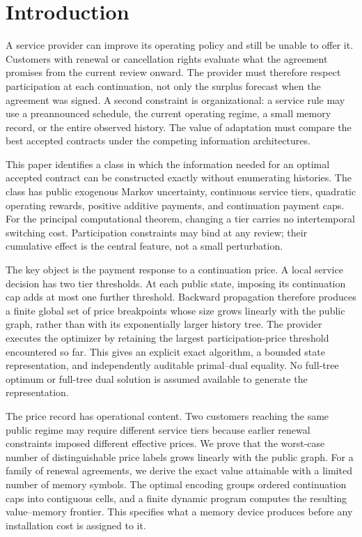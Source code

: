 \section{Introduction}
A service provider can improve its operating policy and still be unable to offer it. Customers with renewal or cancellation rights evaluate what the agreement promises from the current review onward. The provider must therefore respect participation at each continuation, not only the surplus forecast when the agreement was signed. A second constraint is organizational: a service rule may use a preannounced schedule, the current operating regime, a small memory record, or the entire observed history. The value of adaptation must compare the best accepted contracts under the competing information architectures.

This paper identifies a class in which the information needed for an optimal accepted contract can be constructed exactly without enumerating histories. The class has public exogenous Markov uncertainty, continuous service tiers, quadratic operating rewards, positive additive payments, and continuation payment caps. For the principal computational theorem, changing a tier carries no intertemporal switching cost. Participation constraints may bind at any review; their cumulative effect is the central feature, not a small perturbation.

The key object is the payment response to a continuation price. A local service decision has two tier thresholds. At each public state, imposing its continuation cap adds at most one further threshold. Backward propagation therefore produces a finite global set of price breakpoints whose size grows linearly with the public graph, rather than with its exponentially larger history tree. The provider executes the optimizer by retaining the largest participation-price threshold encountered so far. This gives an explicit exact algorithm, a bounded state representation, and independently auditable primal--dual equality. No full-tree optimum or full-tree dual solution is assumed available to generate the representation.

The price record has operational content. Two customers reaching the same public regime may require different service tiers because earlier renewal constraints imposed different effective prices. We prove that the worst-case number of distinguishable price labels grows linearly with the public graph. For a family of renewal agreements, we derive the exact value attainable with a limited number of memory symbols. The optimal encoding groups ordered continuation caps into contiguous cells, and a finite dynamic program computes the resulting value--memory frontier. This specifies what a memory device produces before any installation cost is assigned to it.

